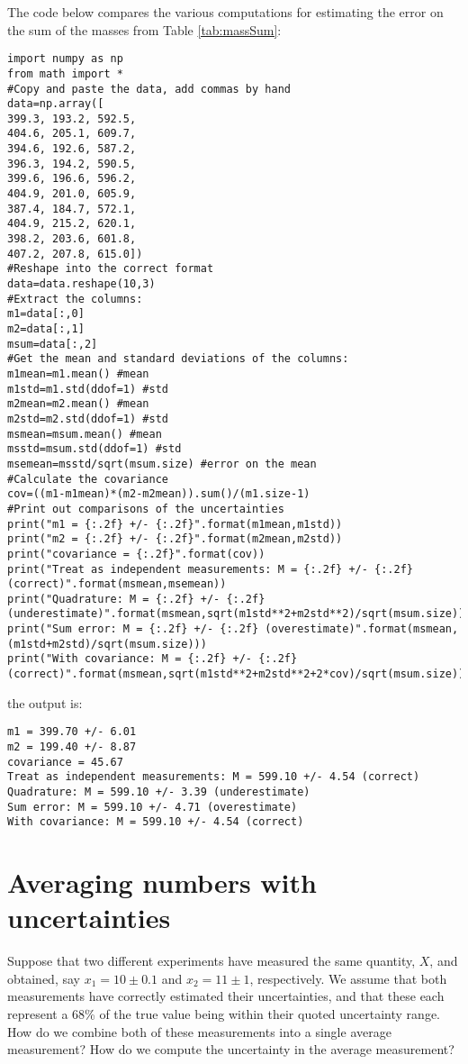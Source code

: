 The code below compares the various computations for estimating the error on the sum of the masses from Table \ref{tab:massSum}:
\begin{lstlisting}[frame=single] 
import numpy as np
from math import *
#Copy and paste the data, add commas by hand
data=np.array([
399.3, 193.2, 592.5,
404.6, 205.1, 609.7,
394.6, 192.6, 587.2,
396.3, 194.2, 590.5,
399.6, 196.6, 596.2,
404.9, 201.0, 605.9,
387.4, 184.7, 572.1,
404.9, 215.2, 620.1,
398.2, 203.6, 601.8,
407.2, 207.8, 615.0])
#Reshape into the correct format
data=data.reshape(10,3)
#Extract the columns:
m1=data[:,0]
m2=data[:,1]
msum=data[:,2]
#Get the mean and standard deviations of the columns:
m1mean=m1.mean() #mean
m1std=m1.std(ddof=1) #std
m2mean=m2.mean() #mean
m2std=m2.std(ddof=1) #std
msmean=msum.mean() #mean
msstd=msum.std(ddof=1) #std
msemean=msstd/sqrt(msum.size) #error on the mean
#Calculate the covariance
cov=((m1-m1mean)*(m2-m2mean)).sum()/(m1.size-1)
#Print out comparisons of the uncertainties
print("m1 = {:.2f} +/- {:.2f}".format(m1mean,m1std))
print("m2 = {:.2f} +/- {:.2f}".format(m2mean,m2std))
print("covariance = {:.2f}".format(cov))
print("Treat as independent measurements: M = {:.2f} +/- {:.2f} (correct)".format(msmean,msemean))
print("Quadrature: M = {:.2f} +/- {:.2f} (underestimate)".format(msmean,sqrt(m1std**2+m2std**2)/sqrt(msum.size)))
print("Sum error: M = {:.2f} +/- {:.2f} (overestimate)".format(msmean,(m1std+m2std)/sqrt(msum.size)))
print("With covariance: M = {:.2f} +/- {:.2f} (correct)".format(msmean,sqrt(m1std**2+m2std**2+2*cov)/sqrt(msum.size)))
\end{lstlisting}
the output is:
\begin{verbatim}
m1 = 399.70 +/- 6.01
m2 = 199.40 +/- 8.87
covariance = 45.67
Treat as independent measurements: M = 599.10 +/- 4.54 (correct)
Quadrature: M = 599.10 +/- 3.39 (underestimate)
Sum error: M = 599.10 +/- 4.71 (overestimate)
With covariance: M = 599.10 +/- 4.54 (correct)
\end{verbatim}



\section{Averaging numbers with uncertainties}
Suppose that two different experiments have measured the same quantity, $X$, and obtained, say $x_1=10 \pm 0.1$ and $x_2=11 \pm 1$, respectively. We assume that both measurements have correctly estimated their uncertainties, and that these each represent a 68\% of the true value being within their quoted uncertainty range. How do we combine both of these measurements into a single average measurement? How do we compute the uncertainty in the average measurement?

